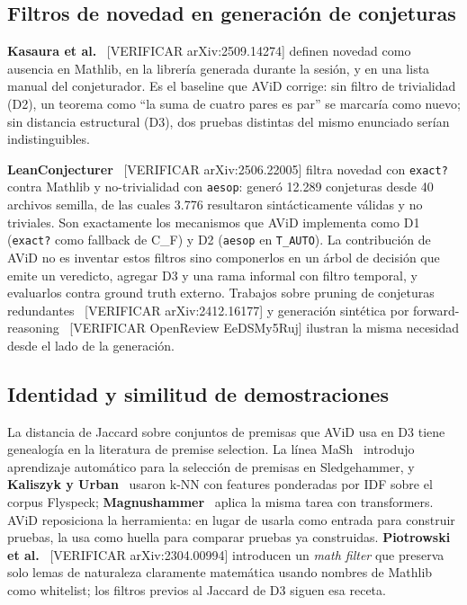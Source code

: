 \documentclass[12pt,a4paper]{article}
\theoremstyle{remark}
\begin{document}

\subsection{Filtros de novedad en generación de conjeturas}

\textbf{Kasaura et al.}~\cite{kasaura2025} [VERIFICAR arXiv:2509.14274] definen novedad como ausencia en Mathlib, en la librería generada durante la sesión, y en una lista manual del conjeturador. Es el baseline que AViD corrige: sin filtro de trivialidad (D2), un teorema como ``la suma de cuatro pares es par'' se marcaría como nuevo; sin distancia estructural (D3), dos pruebas distintas del mismo enunciado serían indistinguibles.

\textbf{LeanConjecturer}~\cite{leanconjecturer2025} [VERIFICAR arXiv:2506.22005] filtra novedad con \texttt{exact?} contra Mathlib y no-trivialidad con \texttt{aesop}: generó 12.289 conjeturas desde 40 archivos semilla, de las cuales 3.776 resultaron sintácticamente válidas y no triviales. Son exactamente los mecanismos que AViD implementa como D1 (\texttt{exact?} como fallback de C\_F) y D2 (\texttt{aesop} en \texttt{T\_AUTO}). La contribución de AViD no es inventar estos filtros sino componerlos en un árbol de decisión que emite un veredicto, agregar D3 y una rama informal con filtro temporal, y evaluarlos contra ground truth externo. Trabajos sobre pruning de conjeturas redundantes~\cite{mining2024} [VERIFICAR arXiv:2412.16177] y generación sintética por forward-reasoning~\cite{synthetic2024} [VERIFICAR OpenReview EeDSMy5Ruj] ilustran la misma necesidad desde el lado de la generación.

\subsection{Identidad y similitud de demostraciones}

La distancia de Jaccard sobre conjuntos de premisas que AViD usa en D3 tiene genealogía en la literatura de premise selection. La línea MaSh~\cite{kuhlwein2013} introdujo aprendizaje automático para la selección de premisas en Sledgehammer, y \textbf{Kaliszyk y Urban}~\cite{kaliszyk2014} usaron k-NN con features ponderadas por IDF sobre el corpus Flyspeck; \textbf{Magnushammer}~\cite{magnushammer2024} aplica la misma tarea con transformers. AViD reposiciona la herramienta: en lugar de usarla como entrada para construir pruebas, la usa como huella para comparar pruebas ya construidas. \textbf{Piotrowski et al.}~\cite{piotrowski2023} [VERIFICAR arXiv:2304.00994] introducen un \textit{math filter} que preserva solo lemas de naturaleza claramente matemática usando nombres de Mathlib como whitelist; los filtros previos al Jaccard de D3 siguen esa receta.
\end{document}

